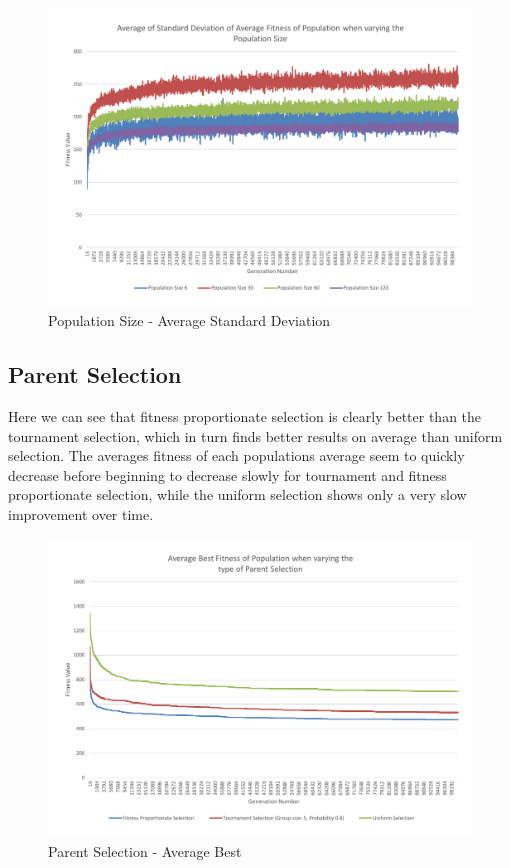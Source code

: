 \begin{figure}[thbp]
	\centerline{\includegraphics[width=\paperwidth]{figures/CircleTests/CircleTestsPopulationAverageStandardDeviation.pdf}}
	\caption{Population Size - Average Standard Deviation}
\end{figure}

\clearpage

\subsection{Parent Selection} %
\label{sub:parent_selection}

Here we can see that fitness proportionate selection is clearly better than the tournament selection, which in turn finds better results on average than uniform selection. The averages fitness of each populations average seem to quickly decrease before beginning to decrease slowly for tournament and fitness proportionate selection, while the uniform selection shows only a very slow improvement over time.

\begin{figure}[thbp]
	\centerline{\includegraphics[width=\paperwidth]{figures/CircleTests/CircleTestParentSelectionAverageBest.pdf}}
	\caption{Parent Selection - Average Best}
\end{figure}

